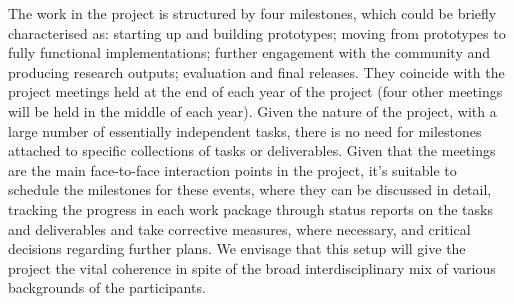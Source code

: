 
The work in the \TheProject project is structured by four milestones,
which could be briefly characterised as:
starting up and building prototypes; 
moving from prototypes to fully functional implementations; 
further engagement with the community and producing research outputs; 
evaluation and final releases. They coincide with the project meetings 
held at the end of each year of the project (four other meetings will 
be held in the middle of each year). 
Given the nature of the project, with a
large number of essentially independent tasks, there is no need for
milestones attached to specific collections of tasks or
deliverables.
Given that the meetings are the main
face-to-face interaction points in the project, it's suitable to
schedule the milestones for these events, where they can be discussed
in detail, tracking the progress in each work package through status
reports on the tasks and deliverables and take corrective measures,
where necessary, and critical decisions regarding further plans.
We envisage that this setup will give the project the vital coherence
in spite of the broad interdisciplinary mix of various backgrounds of the
participants.



